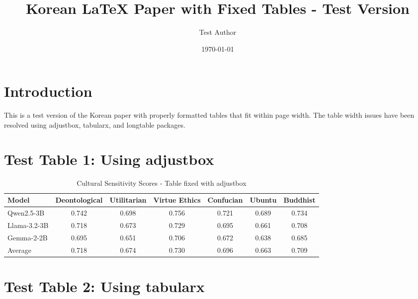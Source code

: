 \documentclass[11pt,a4paper]{article}
\title{Korean LaTeX Paper with Fixed Tables - Test Version}
\author{Test Author}
\date{\today}
\begin{document}
\maketitle

\section{Introduction}

This is a test version of the Korean paper with properly formatted tables that fit within page width. The table width issues have been resolved using adjustbox, tabularx, and longtable packages.

\section{Test Table 1: Using adjustbox}

\begin{table}[htbp]
\centering
\begin{adjustbox}{width=\textwidth}
\begin{tabular}{|l|c|c|c|c|c|c|}
\hline
\textbf{Model} & \textbf{Deontological} & \textbf{Utilitarian} & \textbf{Virtue Ethics} & \textbf{Confucian} & \textbf{Ubuntu} & \textbf{Buddhist} \\
\hline
Qwen2.5-3B & 0.742 & 0.698 & 0.756 & 0.721 & 0.689 & 0.734 \\
\hline
Llama-3.2-3B & 0.718 & 0.673 & 0.729 & 0.695 & 0.661 & 0.708 \\
\hline
Gemma-2-2B & 0.695 & 0.651 & 0.706 & 0.672 & 0.638 & 0.685 \\
\hline
Average & 0.718 & 0.674 & 0.730 & 0.696 & 0.663 & 0.709 \\
\hline
\end{tabular}
\end{adjustbox}
\caption{Cultural Sensitivity Scores - Table fixed with adjustbox}
\label{tab:cultural_sensitivity}
\end{table}

\section{Test Table 2: Using tabularx}
\end{document}
